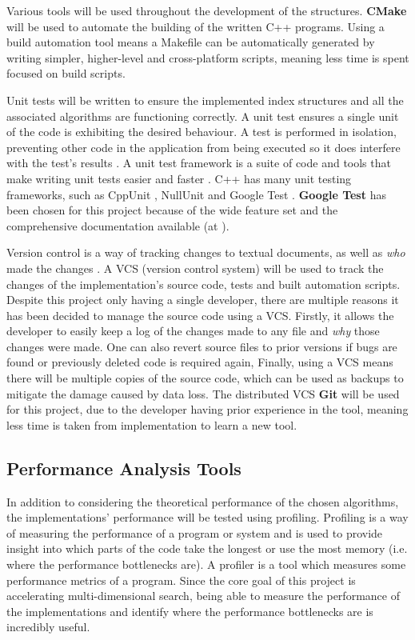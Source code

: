 Various tools will be used throughout the development of the structures. \textbf{CMake} \cite{cmake} will be used to automate the building of the written C++ programs. Using a build automation tool means a Makefile can be automatically generated by writing simpler, higher-level and cross-platform scripts, meaning less time is spent focused on build scripts.

Unit tests will be written to ensure the implemented index structures and all the associated algorithms are functioning correctly. A unit test ensures a single unit of the code is exhibiting the desired behaviour. A test is performed in isolation, preventing other code in the application from being executed so it does interfere with the test's results \cite{automated-defect-prevention}. A unit test framework is a suite of code and tools that make writing unit tests easier and faster \cite{unit-test-frameworks}. C++ has many unit testing frameworks, such as CppUnit \cite{cppunit}, NullUnit \cite{nullunit} and Google Test \cite{google-test}. \textbf{Google Test} has been chosen for this project because of the wide feature set and the comprehensive documentation available (at \cite{google-test}).

Version control is a way of tracking changes to textual documents, as well as \textit{who} made the changes \cite{pragmatic-version-control}. A VCS (version control system) will be used to track the changes of the implementation's source code, tests and built automation scripts. Despite this project only having a single developer, there are multiple reasons it has been decided to manage the source code using a VCS. Firstly, it allows the developer to easily keep a log of the changes made to any file and \textit{why} those changes were made. One can also revert source files to prior versions if bugs are found or previously deleted code is required again, Finally, using a VCS means there will be multiple copies of the source code, which can be used as backups to mitigate the damage caused by data loss. The distributed VCS \textbf{Git} \cite{git} will be used for this project, due to the developer having prior experience in the tool, meaning less time is taken from implementation to learn a new tool.

\subsection{Performance Analysis Tools}

In addition to considering the theoretical performance of the chosen algorithms, the implementations' performance will be tested using profiling. Profiling is a way of measuring the performance of a program or system \cite{efficient-cpp} and is used to provide insight into which parts of the code take the longest or use the most memory (i.e. where the performance bottlenecks are). A profiler is a tool which measures some performance metrics of a program. Since the core goal of this project is accelerating multi-dimensional search, being able to measure the performance of the implementations and identify where the performance bottlenecks are is incredibly useful.

